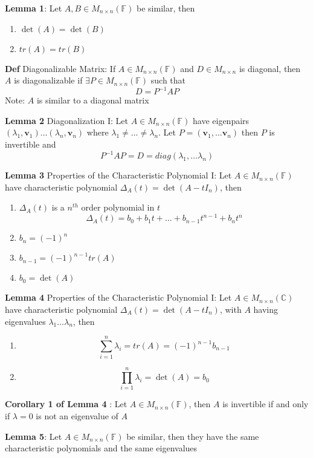 \documentclass[11pt,notitlepage]{report}
\newcommand{\bb}[1]{\ensuremath{\mathbb{#1}}}
\newcommand{\tbf}[1]{\textbf{#1}}
\begin{document}
\textbf{Lemma 1}: Let $A, B \in M_{n \times n}(\bb F)$ be similar, then
\begin{enumerate}[label=(\roman*)]
    \item $\det(A) = \det(B)$
    \item $tr(A) = tr(B)$
\end{enumerate}

\textbf{Def} Diagonalizable Matrix: If $A \in M_{n \times n}(\bb F)$ and $D \in M_{n \times n}$ is diagonal, then $A$ is diagonalizable if $\exists P \in M_{n \times n}(\bb F)$ such that
$$D = P^{-1}AP$$
\hspace*{5mm} Note: $A$ is similar to a diagonal matrix

\textbf{Lemma 2} Diagonalization I: Let $A \in M_{n \times n}(\bb F)$ have eigenpairs $(\lambda_1, \tbf v_1) \dots (\lambda_n, \tbf v_n)$ where $\lambda_1 \ne \dots \ne \lambda_n$. Let $P = (\tbf v_1, \dots \tbf v_n)$ then $P$ is invertible and
$$P^{-1}AP = D = diag(\lambda_1, \dots \lambda_n)$$

\textbf{Lemma 3} Properties of the Characteristic Polynomial I: Let $A \in M_{n \times n}(\bb F)$ have characteristic polynomial $\Delta_A(t) = \det(A-t I_n)$, then
\begin{enumerate}[label=(\roman*)]
    \item $\Delta_A(t)$ is a $n^{th}$ order polynomial in $t$
    $$\Delta_A(t) = b_0 + b_1 t + \dots + b_{n-1}t^{n-1} + b_nt^n$$
    \item $b_n = (-1)^n$
    \item $b_{n-1} = (-1)^{n-1} tr(A)$
    \item $b_0 = \det(A)$
\end{enumerate}

\textbf{Lemma 4} Properties of the Characteristic Polynomial I: Let $A \in M_{n \times n}(\bb C)$ have characteristic polynomial $\Delta_A(t) = \det(A-t I_n)$, with $A$ having eigenvalues $\lambda_1 \dots \lambda_n$, then
\begin{enumerate}[label=(\roman*)]
    \item $$\sum^n_{i=1} \lambda_i = tr(A) = (-1)^{n-1}b_{n-1}$$
    \item $$\prod^n_{i=1} \lambda_i = \det(A) = b_0$$
\end{enumerate}

\textbf{Corollary 1 of Lemma 4} : Let $A \in M_{n \times n}(\bb F)$, then $A$ is invertible if and only if
$\lambda = 0$ is not an eigenvalue of $A$

\textbf{Lemma 5}: Let $A \in M_{n \times n}(\bb F)$ be similar, then they have the same characteristic polynomials and the same eigenvalues
\end{document}
